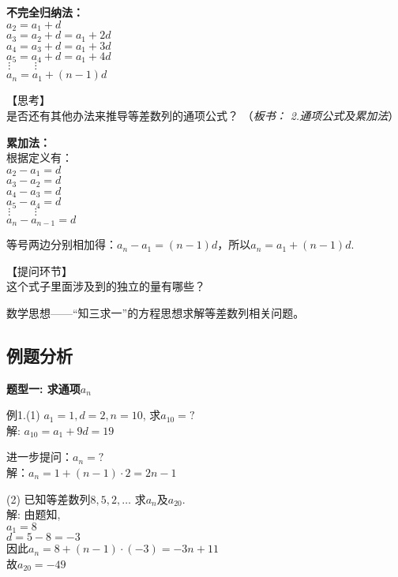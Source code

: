 \documentclass[10pt,a4paper]{article}
\begin{document}
				\textbf{不完全归纳法：}\\
				$a_2=a_1+d$\\ 
				$a_3=a_2+d=a_1+2d$\\
				$a_4=a_3+d=a_1+3d$\\
				$a_5=a_4+d=a_1+4d$\\
				$\hspace{2pt}\vdots \hspace{26pt} \vdots$\\
				$a_n=a_1+(n-1)d$

				【思考】\\
				是否还有其他办法来推导等差数列的通项公式？ （\emph{板书： 2.通项公式及累加法}）
				\newpage

				\textbf{累加法：}\\
				根据定义有：\\
				$a_2-a_1=d$\\ 
				$a_3-a_2=d$\\ 
				$a_4-a_3=d$\\ 
				$a_5-a_4=d$\\ 
				$\hspace{2pt}\vdots \hspace{26pt} \vdots$\\
				$a_n-a_{n-1}=d$

				等号两边分别相加得：$a_n-a_1=(n-1)d$，所以$a_n=a_1+(n-1)d$. 


				【提问环节】\\
				这个式子里面涉及到的独立的量有哪些？

				数学思想——“知三求一”的方程思想求解等差数列相关问题。



		\subsection{例题分析} %
		\label{sub:例题分析}

			\textbf{题型一: 求通项$a_n$}

				例1.(1) $a_1=1, d=2, n=10$, 求$a_{10}=?$\\ 
				\textcolor[rgb]{0.5,0.5,0.5}{解: $a_{10}=a_1+9d  =19$}

				进一步提问：$a_n=?$\\
				\textcolor[rgb]{0.5,0.5,0.5}{解：$a_n=1+(n-1)\cdot 2=2n-1$}

				(2) 已知等差数列$8, 5, 2, \ldots$ 求$a_n$及$a_{20}$.\\ 
				\textcolor[rgb]{0.5,0.5,0.5}{解: 由题知, \\ $a_1=8$\\ 
				$d=5-8=-3$\\ 
				因此$a_n=8+(n-1)\cdot(-3)=-3n+11$\\ 
				故$a_{20}=-49$}
					
\end{document}
